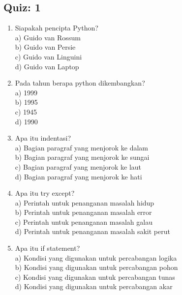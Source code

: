 \subsection{Quiz: 1}
\begin{enumerate}
\item Siapakah pencipta Python?\\
a) Guido van Rossum\\
b) Guido van Persie\\
c) Guido van Linguini\\
d) Guido van Laptop

\item Pada tahun berapa python dikembangkan?\\
a) 1999\\
b) 1995\\
c) 1945\\
d) 1990

\item Apa itu indentasi?\\
a) Bagian paragraf yang menjorok ke dalam\\
b) Bagian paragraf yang menjorok ke sungai\\
c) Bagian paragraf yang menjorok ke laut\\
d) Bagian paragraf yang menjorok ke hati

\item Apa itu try except?\\
a) Perintah untuk penanganan masalah hidup\\
b) Perintah untuk penanganan masalah error\\
c) Perintah untuk penanganan masalah galau\\
d) Perintah untuk penanganan masalah sakit perut

\item Apa itu if statement?\\
a) Kondisi yang digunakan untuk percabangan logika\\
b) Kondisi yang digunakan untuk percabangan pohon\\
c) Kondisi yang digunakan untuk percabangan tunas\\
d) Kondisi yang digunakan untuk percabangan akar
\end{enumerate}
